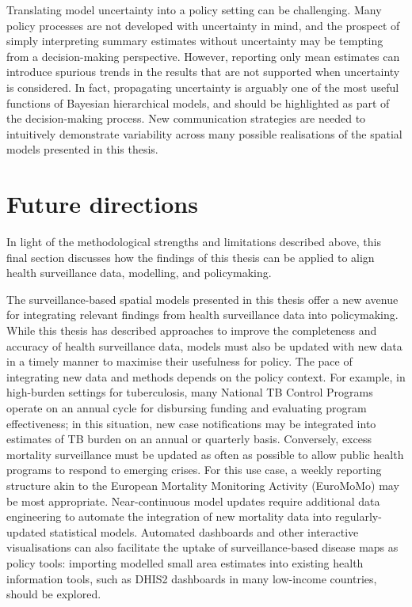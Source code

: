 \documentclass[
]{report}
\begin{document}
Translating model uncertainty into a policy setting can be challenging. Many policy processes are not developed with uncertainty in mind, and the prospect of simply interpreting summary estimates without uncertainty may be tempting from a decision-making perspective. However, reporting only mean estimates can introduce spurious trends in the results that are not supported when uncertainty is considered. In fact, propagating uncertainty is arguably one of the most useful functions of Bayesian hierarchical models, and should be highlighted as part of the decision-making process. New communication strategies are needed to intuitively demonstrate variability across many possible realisations of the spatial models presented in this thesis.\autocite{Patil2011}

\hypertarget{future-directions}{%
\section{Future directions}\label{future-directions}}

In light of the methodological strengths and limitations described above, this final section discusses how the findings of this thesis can be applied to align health surveillance data, modelling, and policymaking.

The surveillance-based spatial models presented in this thesis offer a new avenue for integrating relevant findings from health surveillance data into policymaking. While this thesis has described approaches to improve the completeness and accuracy of health surveillance data, models must also be updated with new data in a timely manner to maximise their usefulness for policy. The pace of integrating new data and methods depends on the policy context. For example, in high-burden settings for tuberculosis, many National TB Control Programs operate on an annual cycle for disbursing funding and evaluating program effectiveness; in this situation, new case notifications may be integrated into estimates of TB burden on an annual or quarterly basis. Conversely, excess mortality surveillance must be updated as often as possible to allow public health programs to respond to emerging crises. For this use case, a weekly reporting structure akin to the European Mortality Monitoring Activity (EuroMoMo) may be most appropriate. Near-continuous model updates require additional data engineering to automate the integration of new mortality data into regularly-updated statistical models. Automated dashboards and other interactive visualisations can also facilitate the uptake of surveillance-based disease maps as policy tools: importing modelled small area estimates into existing health information tools, such as DHIS2 dashboards in many low-income countries, should be explored.
\end{document}
